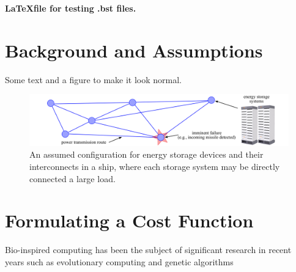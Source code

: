\documentclass[11pt,letterpaper]{article}
\begin{document}
\begin{center}{\Large 
	\textbf{\LaTeX file for testing .bst files.}}
\end{center}





\section*{Background and Assumptions}	

Some text and a figure to make it look normal.
		
		
	  \begin{figure}[H]
	      \centering
	      \vspace{-1ex}
	      \includegraphics[width=6.5in]{figures/Energy_storage.png}
	      \caption{An assumed configuration for energy storage devices and their interconnects in a ship, where each storage system may be directly connected a large load.}
	      \vspace{-1ex}
	      \label{fig:Energy_storage}
	  \end{figure}		
		
		
		
	\section{Formulating a Cost Function}		

	

Bio-inspired computing has been the subject of significant research in recent years such as evolutionary computing and genetic algorithms \cite{test1,test2} 
	
	
	



			
\pagestyle{empty}
	\FloatBarrier
	\renewcommand{\thepage}{}
	\renewcommand\refname{References Cited}
	
\end{document}

